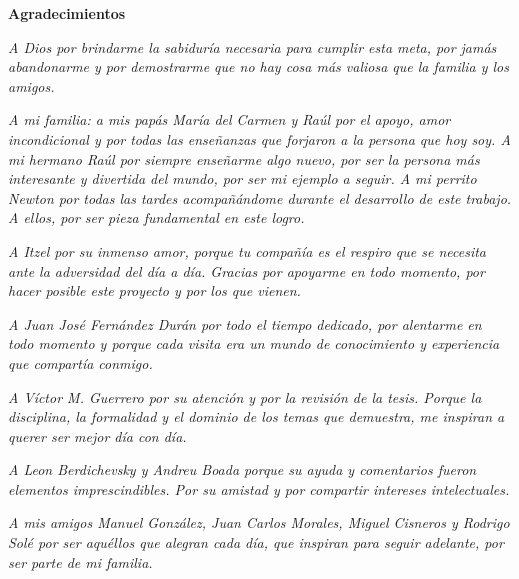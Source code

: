 \begin{center}
{\huge \bfseries Agradecimientos\\}
\end{center}

\vspace{6 mm}
\noindent
 \textit{A Dios por brindarme la sabiduría necesaria para cumplir esta meta, por jamás abandonarme y por demostrarme que no hay cosa más valiosa que la familia y los amigos.}

\vspace{6 mm}
\noindent
 \textit{A mi familia: a mis papás Mar\'ia del Carmen y Ra\'ul  por el apoyo, amor incondicional y por todas las enseñanzas que forjaron a la persona que hoy soy. A mi hermano Raúl por siempre enseñarme algo nuevo, por ser la persona más interesante y divertida del mundo, por ser mi ejemplo a seguir. A mi perrito Newton por todas las tardes acompañándome durante el desarrollo de este trabajo. A ellos, por ser pieza fundamental en este logro.}

\vspace{6 mm}
\noindent
 \textit{A Itzel por su inmenso amor, porque tu compañía es el respiro que se necesita ante la adversidad del día a día. Gracias por apoyarme en todo momento, por hacer posible este proyecto y por los que vienen.}

\vspace{6 mm}
\noindent
 \textit{A Juan José Fernández Durán por todo el tiempo dedicado, por alentarme en todo momento y porque cada visita era un mundo de conocimiento y experiencia que compartía conmigo.}

\vspace{6 mm}
\noindent
 \textit{A Víctor M. Guerrero por su atención y por la revisión de la tesis. Porque la disciplina, la formalidad y el dominio de los temas que demuestra, me inspiran a querer ser mejor día con día.}

\vspace{6 mm}
\noindent
 \textit{A Leon Berdichevsky y Andreu Boada porque su ayuda y comentarios fueron elementos imprescindibles. Por su amistad y por compartir intereses intelectuales.}

\vspace{6 mm}
\noindent
 \textit{A mis amigos Manuel González, Juan Carlos Morales, Miguel Cisneros y Rodrigo Solé por ser aquéllos que alegran cada día, que inspiran para seguir adelante, por ser parte de mi familia.}





\clearpage
